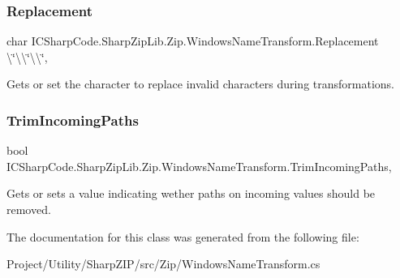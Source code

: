 \subsubsection{\texorpdfstring{Replacement}{Replacement}}
{\footnotesize\ttfamily char I\+C\+Sharp\+Code.\+Sharp\+Zip\+Lib.\+Zip.\+Windows\+Name\+Transform.\+Replacement \textbackslash{}\char`\"{}\textbackslash{}\textbackslash{}\char`\"{}\textbackslash{}\textbackslash{}\char`\"{}\hspace{0.3cm}{\ttfamily [get]}, {\ttfamily [set]}}



Gets or set the character to replace invalid characters during transformations. 

\mbox{\label{class_i_c_sharp_code_1_1_sharp_zip_lib_1_1_zip_1_1_windows_name_transform_afd88be88fd031d5896080fe81a5202c1}} 
\subsubsection{\texorpdfstring{Trim\+Incoming\+Paths}{TrimIncomingPaths}}
{\footnotesize\ttfamily bool I\+C\+Sharp\+Code.\+Sharp\+Zip\+Lib.\+Zip.\+Windows\+Name\+Transform.\+Trim\+Incoming\+Paths\hspace{0.3cm}{\ttfamily [get]}, {\ttfamily [set]}}



Gets or sets a value indicating wether paths on incoming values should be removed. 



The documentation for this class was generated from the following file\+:\begin{DoxyCompactItemize}
\item 
Project/\+Utility/\+Sharp\+Z\+I\+P/src/\+Zip/Windows\+Name\+Transform.\+cs\end{DoxyCompactItemize}
